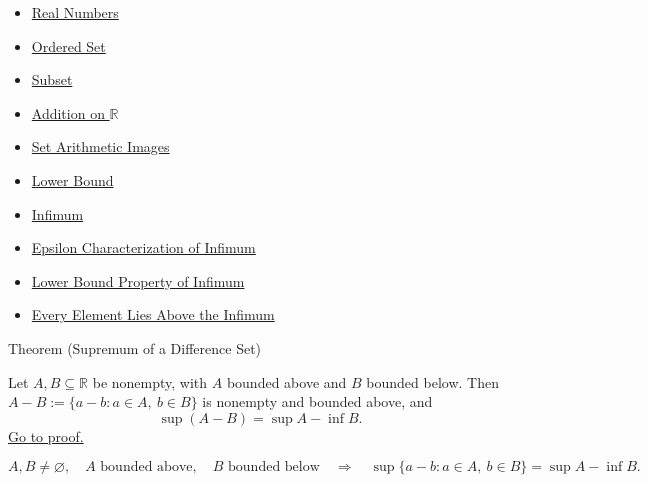 \begin{dependencies}
\begin{itemize}
  \item \hyperref[def:reals]{Real Numbers}
  \item \hyperref[def:ordered-set]{Ordered Set}
  \item \hyperref[def:subset]{Subset}
  \item \hyperref[def:addition-on-r]{Addition on $\mathbb{R}$}
  \item \hyperref[def:set-arithmetic-images]{Set Arithmetic Images}
  \item \hyperref[def:real-lower-bound]{Lower Bound}
  \item \hyperref[def:infimum]{Infimum}
  \item \hyperref[def:epsilon-characterization-of-infimum]{Epsilon Characterization of Infimum}
  \item \hyperref[prop:lower-bound-property-of-infimum]{Lower Bound Property of Infimum}
  \item \hyperref[prop:every-element-lies-above-the-infimum]{Every Element Lies Above the Infimum}
\end{itemize}
\end{dependencies}






















\begin{theorembox}{Theorem (Supremum of a Difference Set)}
\begin{theorem}
\label{thm:supremum-difference-set}
Let $A,B\subseteq\mathbb{R}$ be nonempty, with $A$ bounded above and $B$
bounded below.  Then $A-B:=\{a-b:a\in A,\ b\in B\}$ is nonempty and bounded
above, and
\[
  \sup(A-B)=\sup A-\inf B.
\]
\hyperref[prf:supremum-difference-set]{Go to proof.}
\end{theorem}
\end{theorembox}

\begin{remark*}
\[
A,B\neq\varnothing,\quad A\text{ bounded above},\quad B\text{ bounded below}
\quad\Longrightarrow\quad
\sup\{a-b:a\in A,\ b\in B\}=\sup A-\inf B.
\]
\end{remark*}

